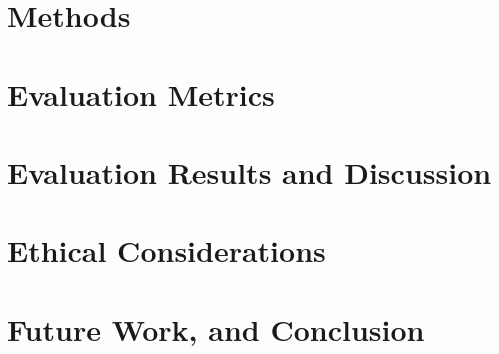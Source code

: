\documentclass[10pt,twocolumn]{article}
\begin{document}
\section{Methods}


\section{Evaluation Metrics}


\section{Evaluation Results and Discussion}


\section{Ethical Considerations}


\section{Future Work, and Conclusion}
\end{document}
